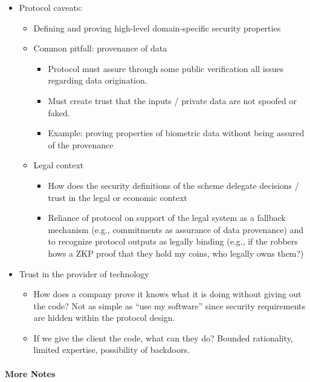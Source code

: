 \begin{itemize}[label={- }]
\item Protocol caveats:
		\begin{itemize}[label={- }]
				\item Defining and proving high-level domain-specific security properties
				\item Common pitfall: provenance of data
						\begin{itemize}[label={- }]
						\item Protocol must assure through some public verification all issues regarding
						data origination.
						\item Must create trust that the inputs / private data are not spoofed or faked.
						\item Example: proving properties of biometric data without being assured of
						the provenance
						\end{itemize}
				\item Legal context
						\begin{itemize}[label={- }]
							\item How does the security definitions of the scheme delegate decisions / trust
										in the legal or economic context
							\item Reliance of protocol on support of the legal system as a fallback
										mechanism (e.g., commitments as assurance of data provenance) and to
										recognize protocol outputs as legally binding (e.g., if the robbers hows a
										ZKP proof that they hold my coins, who legally owns them?)
						\end{itemize}
		\end{itemize}

\item Trust in the provider of technology
		\begin{itemize}[label={- }]
		\item How does a company prove it knows what it is doing without giving out the code?
		Not as simple as “use my software” since security requirements are hidden within
		the protocol design.
		\item If we give the client the code, what can they do? Bounded rationality, limited
		expertise, possibility of backdoors.
		\end{itemize}
\end{itemize}


\paragraph{More Notes}

